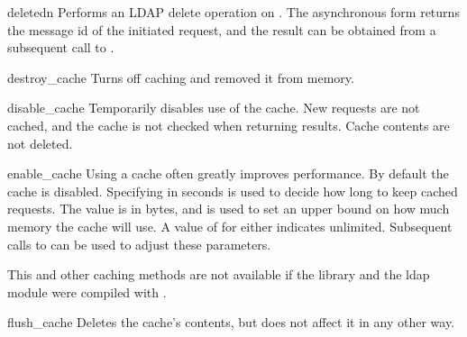 
\begin{funcdesc}{delete}{dn}
Performs an LDAP delete operation on . The asynchronous form
returns the message id of the initiated request, and the result can be obtained
from a subsequent call to .
\end{funcdesc}


\begin{funcdesc}{destroy_cache}{}
Turns off caching and removed it from memory.
\end{funcdesc}


\begin{funcdesc}{disable_cache}{}
Temporarily disables use of the cache. New requests are not cached, and
the cache is not checked when returning results. Cache contents are not
deleted.
\end{funcdesc}


\begin{funcdesc}{enable_cache}{}
Using a cache often greatly improves performance. By default the cache
is disabled. Specifying  in seconds is used to decide how long
to keep cached requests. The  value is in bytes, and is used
to set an upper bound on how much memory the cache will use. A value of
 for either indicates unlimited. 
Subsequent calls to
 can be used to adjust these parameters.

This and other caching methods are not available if the library and the 
ldap module were compiled with .
\end{funcdesc}


\begin{funcdesc}{flush_cache}{}
Deletes the cache's contents, but does not affect it in any other way.
\end{funcdesc}

